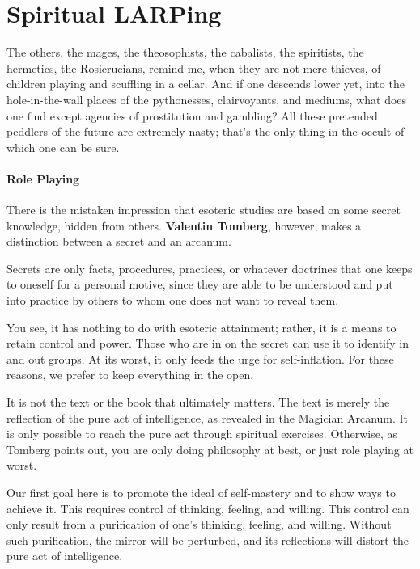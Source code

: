 \section{Spiritual LARPing}

\begin{quotex}
The others, the mages, the theosophists, the cabalists, the spiritists, the hermetics, the Rosicrucians, remind me, when they are not mere thieves, of children playing and scuffling in a cellar. And if one descends lower yet, into the hole-in-the-wall places of the pythonesses, clairvoyants, and mediums, what does one find except agencies of prostitution and gambling? All these pretended peddlers of the future are extremely nasty; that's the only thing in the occult of which one can be sure. 

\end{quotex}
\paragraph{Role Playing}
There is the mistaken impression that esoteric studies are based on some secret knowledge, hidden from others. \textbf{Valentin Tomberg}, however, makes a distinction between a secret and an arcanum.

\begin{quotex}
Secrets are only facts, procedures, practices, or whatever doctrines that one keeps to oneself for a personal motive, since they are able to be understood and put into practice by others to whom one does not want to reveal them. 

\end{quotex}
You see, it has nothing to do with esoteric attainment; rather, it is a means to retain control and power. Those who are in on the secret can use it to identify in and out groups. At its worst, it only feeds the urge for self-inflation. For these reasons, we prefer to keep everything in the open.

It is not the text or the book that ultimately matters. The text is merely the reflection of the pure act of intelligence, as revealed in the Magician Arcanum. It is only possible to reach the pure act through spiritual exercises. Otherwise, as Tomberg points out, you are only doing philosophy at best, or just role playing at worst.

Our first goal here is to promote the ideal of self-mastery and to show ways to achieve it. This requires control of thinking, feeling, and willing. This control can only result from a purification of one's thinking, feeling, and willing. Without such purification, the mirror will be perturbed, and its reflections will distort the pure act of intelligence.


